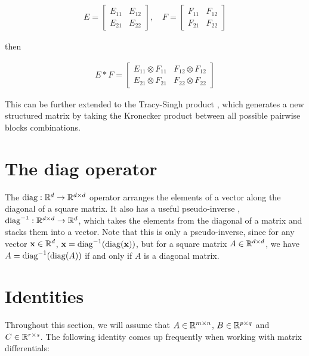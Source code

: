 \begin{align}
  E = \left[\begin{array}{c|c}
 E_{11} & E_{12} \\
 \hline
 E_{21} & E_{22}
 \end{array}\right], \quad
   F = \left[\begin{array}{c|c}
 F_{11} & F_{12} \\
 \hline
 F_{21} & F_{22}
 \end{array}\right]
\end{align}

then

\begin{align}
  E \ast F = \left[\begin{array}{c|c}
 E_{11} \otimes F_{11} & F_{12} \otimes F_{12} \\
 \hline
 E_{21} \otimes F_{21} & F_{22} \otimes F_{22}
 \end{array}\right]
\end{align}

This can be further extended to the Tracy-Singh product \citep{tracy1972new}, which generates a new structured matrix by taking the Kronecker product between all possible pairwise blocks combinations.

\section{The diag operator}

The $\operatorname{diag}: \mathbb{R}^d \to \mathbb{R}^{d \times d}$ operator arranges the elements of a vector along the diagonal of a square matrix.  It also has a useful pseudo-inverse \citep{minka2000old}, $\operatorname{diag}^{-1}: \mathbb{R}^{d \times d} \to \mathbb{R}^d$, which takes the elements from the diagonal of a matrix and stacks them into a vector.  Note that this is only a pseudo-inverse, since for any vector $\mathbf{x} \in \mathbb{R}^d$, $\mathbf{x} = \operatorname{diag}^{-1}(\operatorname{diag}(\mathbf{x}))$, but for a square matrix $A \in \mathbb{R}^{d \times d}$, we have $A = \operatorname{diag}^{-1}(\operatorname{diag}(A))$ if and only if $A$ is a diagonal matrix.

\section{Identities}

 Throughout this section, we will assume that $A \in \mathbb{R}^{m \times n}$, $B \in \mathbb{R}^{p \times q}$ and $C \in \mathbb{R}^{r\times s}$.  The following identity comes up frequently when working with matrix differentials:

